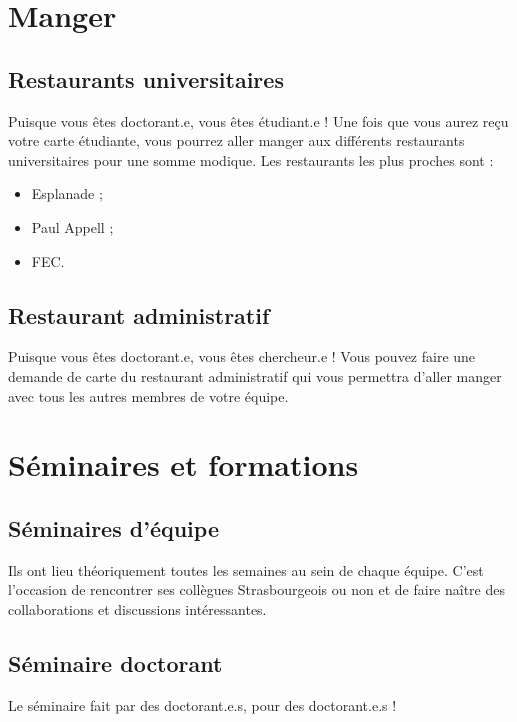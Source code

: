 \documentclass[a5paper]{article}
\begin{document}
\section{Manger}
\label{sec:manger}

\subsection{Restaurants universitaires}
\label{sec:rest-univ}
Puisque vous êtes doctorant.e, vous êtes étudiant.e ! Une fois que
vous aurez reçu votre carte étudiante, vous pourrez
aller manger aux différents restaurants universitaires pour une somme
modique. Les restaurants les plus proches sont :
\begin{itemize}
\item Esplanade ;
\item Paul Appell ;
\item FEC.
\end{itemize}

\subsection{Restaurant administratif}
\label{subsec:rest-admin}
Puisque vous êtes doctorant.e, vous êtes chercheur.e ! Vous pouvez
faire une demande de carte du restaurant administratif qui vous
permettra d'aller manger avec tous les autres membres de votre équipe.

\section{Séminaires et formations}
\label{sec:seminaires-et}

\subsection{Séminaires d'équipe}
\label{subsec:seminaires-dequipe}

Ils ont lieu théoriquement toutes les semaines au sein de chaque équipe. C'est l'occasion de rencontrer ses collègues Strasbourgeois ou non et de faire naître des collaborations et discussions intéressantes.

\subsection{Séminaire doctorant}
\label{subsec:seminaire-doctorant}

Le séminaire fait par des doctorant.e.s, pour des doctorant.e.s !
\end{document}
